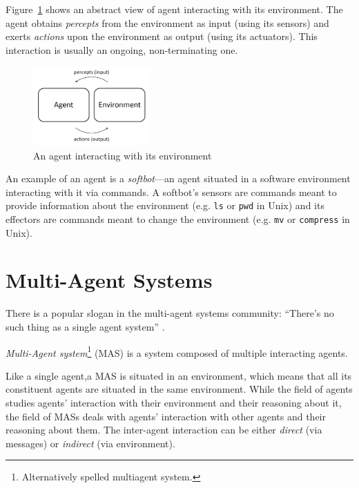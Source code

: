 Figure~\ref{figure:agent-environment-interaction} shows an abstract view of agent interacting with its environment.
The agent obtains \textit{percepts} from the environment as input (using its sensors) and exerts \textit{actions} upon the environment as output (using its actuators).
This interaction is usually an ongoing, non-terminating one.

\begin{figure}[h]
	\centering
	\includegraphics[width=0.4\textwidth]{images/agent-environment-interaction}
	\caption{An agent interacting with its environment}
	\label{figure:agent-environment-interaction}
\end{figure}

An example of an agent is a \textit{softbot}---an agent situated in a software environment interacting with it via commands. A softbot's sensors are commands meant to provide information about the environment (e.g. \texttt{ls} or \texttt{pwd} in Unix) and its effectors are commands meant to change the environment (e.g. \texttt{mv} or \texttt{compress} in Unix).

\section{Multi-Agent Systems}

There is a popular slogan in the multi-agent systems community: ``There's no such thing as a single agent system'' \cite{Wooldridge09}.

\textit{Multi-Agent system}\footnote{Alternatively spelled multiagent system.} (MAS) is a system composed of multiple interacting agents.

Like a single agent,a MAS is situated in an environment, which means that all its constituent agents are situated in the same environment.
While the field of agents studies agents' interaction with their environment and their reasoning about it, the field of MASs deals with agents' interaction with other agents and their reasoning about them.
The inter-agent interaction can be either \textit{direct} (via messages) or \textit{indirect} (via environment).

